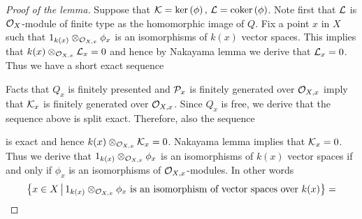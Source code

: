 \begin{proof}[Proof of the lemma]
Suppose that ${\mathcal K} = \mathrm{ker}\left(\phi\right),\,{\mathcal L} = \mathrm{coker}\left(\phi\right)$. Note first that ${\mathcal L}$ is ${\mathcal O}_X$-module of finite type as the homomorphic image of $Q$. Fix a point $x$ in $X$ such that $1_{k(x)}\otimes_{{\mathcal O}_{X,x}}\phi_{x}$ is an isomorphisms of $k(x)$ vector spaces. This implies that $k(x)\otimes_{{\mathcal O}_{X,x}}{\mathcal L}_x = 0$ and hence by Nakayama lemma we derive that ${\mathcal L}_{x} = 0$. Thus we have a short exact sequence
\begin{center}
\end{center}
Facts that $Q_{x}$ is finitely presented and ${\mathcal P}_{x}$ is finitely generated over ${\mathcal O}_{X,x}$ imply that ${\mathcal K}_{x}$ is finitely generated over ${\mathcal O}_{X,x}$. Since $Q_{x}$ is free, we derive that the sequence above is split exact. Therefore, also the sequence
\begin{center}
\end{center}
is exact and hence $k(x)\otimes_{{\mathcal O}_{X,x}}{\mathcal K}_{x} = 0$. Nakayama lemma implies that ${\mathcal K}_{x} = 0$. Thus we derive that $1_{k(x)}\otimes_{{\mathcal O}_{X,x}}\phi_{x}$ is an isomorphisms of $k(x)$ vector spaces if and only if $\phi_{x}$ is an isomorphisms of ${\mathcal O}_{X,x}$-modules. In other words
$$\big\{x\in X\,\big|\,1_{k(x)}\otimes_{{\mathcal O}_{X,x}}\phi_{x}\mbox{ is an isomorphism of vector spaces over }k(x)\big\} = $$

\end{proof}
